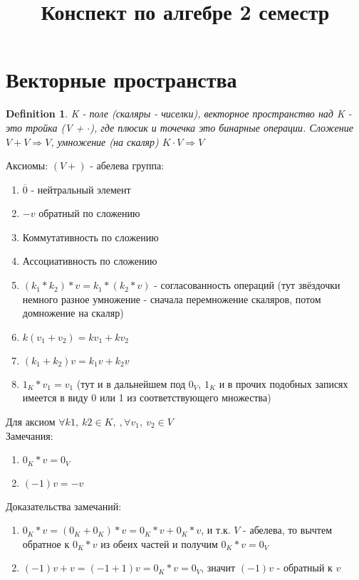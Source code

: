 \documentclass[12pt]{article}
\title{Конспект по алгебре 2 семестр}
\newtheorem{definition}{Definition}
\begin{document}
\maketitle
\section{Векторные пространства}
\begin{definition}
K - поле (скаляры - чиселки), векторное пространство над K - это тройка (V + $\cdot$), где плюсик и точечка это бинарные операции. Сложение $V + V \Rightarrow V$, умножение (на скаляр) $K \cdot V \Rightarrow V$
\end{definition}

Аксиомы: $(V +)$ - абелева группа: \begin{enumerate}
    \item $\overline{0}$ - нейтральный элемент 
    \item $-v$ обратный по сложению
    \item Коммутативность по сложению
    \item Ассоциативность по сложению
    \item $(k_1 * k_2) * v = k_1 * (k_2 * v)$ - согласованность операций (тут звёздочки немного разное умножение - сначала перемножение скаляров, потом домножение на скаляр)
    \item $k (v_1 + v_2) = kv_1 + k v_2$
    \item $(k_1 + k_2) v = k_1v + k_2v$
    \item $1_K * v_1 = v_1$ (тут и в дальнейшем под $0_V$, $1_K$ и в прочих подобных записях имеется в виду 0 или 1 из соответствующего множества)
\end{enumerate} 
Для аксиом $\forall k1,\  k2 \in K, \ , \forall v_1, \ v_2 \in V$
\\

Замечания:
\begin{enumerate}
    \item  $0_K * v = 0_V$
    \item $(-1) v = -v$ 
\end{enumerate}
Доказательства замечаний: 
\begin{enumerate}
    \item $0_K * v = (0_K + 0_K) * v = 0_K * v + 0_K * v$, и т.к. $V$ - абелева, то вычтем обратное к $0_K * v$ из обеих частей и получим $0_K * v = 0_V$
    \item $(-1) v + v = (-1 + 1)v = 0_K*v = 0_V$, значит $(-1)v$ - обратный к $v$
\end{enumerate}
\\
\end{document}

